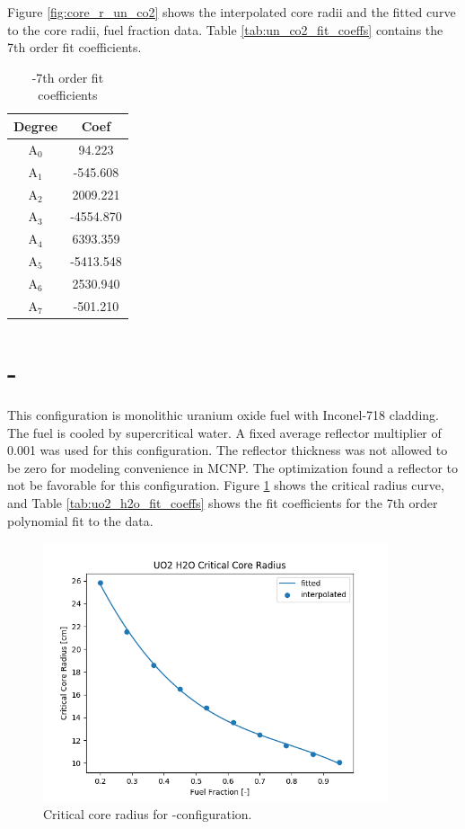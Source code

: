 Figure \ref{fig:core_r_un_co2} shows the interpolated core radii and the fitted
curve to the core radii, fuel fraction data. Table \ref{tab:un_co2_fit_coeffs}
contains the 7th order fit coefficients.

\begin{table}[h]
  \centering
  \caption{\uox-\codiox 7th order fit coefficients}
  \begin{tabular}{cc}
    \toprule
     Degree & Coef\\ 
    \midrule                                  
    A$_0$  &  94.223\\
    A$_1$  &  -545.608\\
    A$_2$  &  2009.221\\
    A$_3$  &  -4554.870\\
    A$_4$  &  6393.359\\
    A$_5$  &  -5413.548\\
    A$_6$  &  2530.940\\
    A$_7$  &  -501.210\\
  \end{tabular}
  \label{tab:uo2_co2_fit_coeffs}
\end{table}


\section{\uox-\water}
This configuration is monolithic uranium oxide fuel with Inconel-718 cladding.
The fuel is cooled by supercritical water. A fixed average reflector multiplier
of 0.001 was used for this configuration. The reflector thickness was not
allowed to be zero for modeling convenience in MCNP. The optimization found a
reflector to not be favorable for this configuration. Figure
\ref{fig:core_r_uo2_h2o} shows the critical radius curve, and Table
\ref{tab:uo2_h2o_fit_coeffs} shows the fit coefficients for the 7th order
polynomial fit to the data.

\begin{figure}[h]
    \centering
    \includegraphics[width=4in]{../images/core_r_uo2_h2o.png}
\caption{Critical core radius for \uox-\water configuration.}
\label{fig:core_r_uo2_h2o}
\end{figure}


